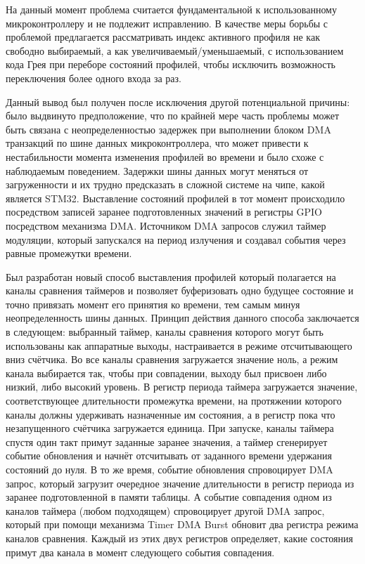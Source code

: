 \documentclass{report}
\begin{document}
На данный момент проблема считается фундаментальной к использованному микроконтроллеру и не подлежит исправлению. В качестве меры борьбы с проблемой предлагается рассматривать индекс активного профиля не как свободно выбираемый, а как увеличиваемый/уменьшаемый, с использованием кода Грея при переборе состояний профилей, чтобы исключить возможность переключения более одного входа за раз.

Данный вывод был получен после исключения другой потенциальной причины: было выдвинуто предположение, что по крайней мере часть проблемы может быть связана с неопределенностью задержек при выполнении блоком DMA транзакций по шине данных микроконтроллера, что может привести к нестабильности момента изменения профилей во времени и было схоже с наблюдаемым поведением. Задержки шины данных могут меняться от загруженности \cite{stm32dmalatency} и их трудно предсказать в сложной системе на чипе, какой является STM32. Выставление состояний профилей в тот момент происходило посредством записей заранее подготовленных значений в регистры GPIO посредством механизма DMA. Источником DMA запросов служил таймер модуляции, который запускался на период излучения и создавал события через равные промежутки времени.

Был разработан новый способ выставления профилей который полагается на каналы сравнения таймеров и позволяет буферизовать одно будущее состояние и точно привязать момент его принятия ко времени, тем самым минуя неопределенность шины данных. Принцип действия данного способа заключается в следующем: выбранный таймер, каналы сравнения которого могут быть использованы как аппаратные выходы, настраивается в режиме отсчитывающего вниз счётчика. Во все каналы сравнения загружается значение ноль, а режим канала выбирается так, чтобы при совпадении, выходу был присвоен либо низкий, либо высокий уровень. В регистр периода таймера загружается значение, соответствующее длительности промежутка времени, на протяжении которого каналы должны удерживать назначенные им состояния, а в регистр пока что незапущенного счётчика загружается единица. При запуске, каналы таймера спустя один такт примут заданные заранее значения, а таймер сгенерирует событие обновления и начнёт отсчитывать от заданного времени удержания состояний до нуля. В то же время, событие обновления спровоцирует DMA запрос, который загрузит очередное значение длительности в регистр периода из заранее подготовленной в памяти таблицы. А событие совпадения одном из каналов таймера (любом подходящем) спровоцирует другой DMA запрос, который при помощи механизма Timer DMA Burst обновит два регистра режима каналов сравнения. Каждый из этих двух регистров определяет, какие состояния примут два канала в момент следующего события совпадения.
\end{document}
